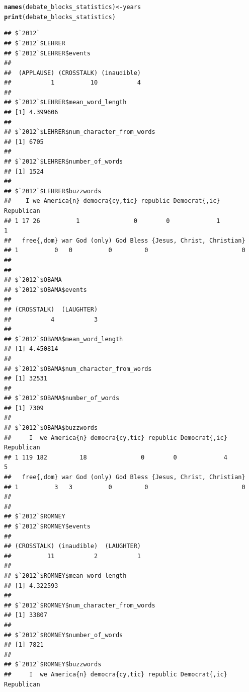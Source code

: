 \documentclass{article}\usepackage[]{graphicx}\usepackage[]{color}
\makeatletter
\newcommand{\hlstd}[1]{\textcolor[rgb]{0.345,0.345,0.345}{#1}}%
\newcommand{\hlkwb}[1]{\textcolor[rgb]{0.69,0.353,0.396}{#1}}%
\newcommand{\hlkwd}[1]{\textcolor[rgb]{0.737,0.353,0.396}{\textbf{#1}}}%
\newenvironment{kframe}{%
 \def\at@end@of@kframe{}%
 \ifinner\ifhmode%
  \def\at@end@of@kframe{\end{minipage}}%
  \begin{minipage}{\columnwidth}%
 \fi\fi%
 \def\FrameCommand##1{\hskip\@totalleftmargin \hskip-\fboxsep
 \colorbox{shadecolor}{##1}\hskip-\fboxsep
     \hskip-\linewidth \hskip-\@totalleftmargin \hskip\columnwidth}%
 \MakeFramed {\advance\hsize-\width
   \@totalleftmargin\z@ \linewidth\hsize
   \@setminipage}}%
 {\par\unskip\endMakeFramed%
 \at@end@of@kframe}
\newenvironment{knitrout}{}{} %
\makeatother
\begin{document}
\begin{knitrout}
\begin{kframe}
{\ttfamily\noindent\color{warningcolor}{\#\# Warning: closing unused connection 5 (http://www.debates.org/index.php?page=2008-debate-transcript)}}

{\ttfamily\noindent\color{warningcolor}{\#\# Warning: closing unused connection 5 (http://www.debates.org/index.php?page=september-30-2004-debate-transcript)}}

{\ttfamily\noindent\color{warningcolor}{\#\# Warning: closing unused connection 5 (http://www.debates.org/index.php?page=october-3-2000-transcript)}}

{\ttfamily\noindent\color{warningcolor}{\#\# Warning: closing unused connection 5 (http://www.debates.org/index.php?page=october-6-1996-debate-transcript)}}\begin{alltt}
\hlkwd{names}\hlstd{(debate_blocks_statistics)} \hlkwb{<-} \hlstd{years}
\hlkwd{print}\hlstd{(debate_blocks_statistics)}
\end{alltt}
\begin{verbatim}
## $`2012`
## $`2012`$LEHRER
## $`2012`$LEHRER$events
## 
##  (APPLAUSE) (CROSSTALK) (inaudible) 
##           1          10           4 
## 
## $`2012`$LEHRER$mean_word_length
## [1] 4.399606
## 
## $`2012`$LEHRER$num_character_from_words
## [1] 6705
## 
## $`2012`$LEHRER$number_of_words
## [1] 1524
## 
## $`2012`$LEHRER$buzzwords
##    I we America{n} democra{cy,tic} republic Democrat{,ic} Republican
## 1 17 26          1               0        0             1          1
##   free{,dom} war God (only) God Bless {Jesus, Christ, Christian}
## 1          0   0          0         0                          0
## 
## 
## $`2012`$OBAMA
## $`2012`$OBAMA$events
## 
## (CROSSTALK)  (LAUGHTER) 
##           4           3 
## 
## $`2012`$OBAMA$mean_word_length
## [1] 4.450814
## 
## $`2012`$OBAMA$num_character_from_words
## [1] 32531
## 
## $`2012`$OBAMA$number_of_words
## [1] 7309
## 
## $`2012`$OBAMA$buzzwords
##     I  we America{n} democra{cy,tic} republic Democrat{,ic} Republican
## 1 119 182         18               0        0             4          5
##   free{,dom} war God (only) God Bless {Jesus, Christ, Christian}
## 1          3   3          0         0                          0
## 
## 
## $`2012`$ROMNEY
## $`2012`$ROMNEY$events
## 
## (CROSSTALK) (inaudible)  (LAUGHTER) 
##          11           2           1 
## 
## $`2012`$ROMNEY$mean_word_length
## [1] 4.322593
## 
## $`2012`$ROMNEY$num_character_from_words
## [1] 33807
## 
## $`2012`$ROMNEY$number_of_words
## [1] 7821
## 
## $`2012`$ROMNEY$buzzwords
##     I  we America{n} democra{cy,tic} republic Democrat{,ic} Republican

\end{verbatim}
\end{kframe}
\end{knitrout}
\end{document}
